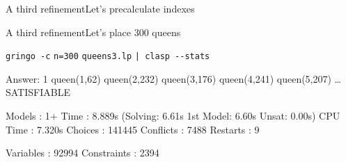 \begin{frame}[fragile]{A third refinement}{Let's precalculate indexes}
  \begin{block}{}%
    \lstset{basicstyle=\ttfamily\footnotesize,aboveskip=0pt,belowskip=0pt}%
                                                                                                       
                                                                                                       
                                                                                                       
\end{block}
\end{frame}
\begin{frame}[fragile]{A third refinement}{Let's place \alert{$300$} queens}
\begin{block}{\alert<1>{\lstinline{gringo -c} \alert{\lstinline{n=300}} \lstinline{queens3.lp} \lstinline{| clasp --stats}}}
\pause\footnotesize%
\begin{semiverbatim}
Answer: 1
queen(1,62) queen(2,232) queen(3,176) queen(4,241) queen(5,207) \dots{}
SATISFIABLE

Models      : 1+
\alert<2-3>{Time        : 8.889s} (\alert<3>{Solving: 6.61s} 1st Model: 6.60s Unsat: 0.00s)
CPU Time    : 7.320s
\alert<2>{Choices     : 141445}
\alert<2>{Conflicts   : 7488}
Restarts    : 9

\alert<2>{Variables   : 92994}
\alert<2>{Constraints : 2394}
\end{semiverbatim}
\end{block}
\end{frame}
